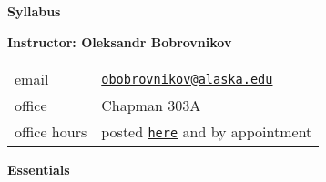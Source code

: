\documentclass[12pt]{article}
\renewcommand{\emph}[1]{\textsf{\textbf{#1}}}
\newcommand{\localhead}[1]{\par\smallskip\textbf{#1}\nobreak\\}%
\def\heading#1{\localhead{\large\emph{#1}}}
\begin{document}
\begin{center}
{\Huge \strut}{\LARGE\sf \textbf{Syllabus}}
\end{center}

\heading{Instructor: \quad Oleksandr Bobrovnikov}

\quad \begin{tabularx}{\textwidth}{lX}
email        & \href{mailto:obobrovnikov@alaska.edu}{\texttt{obobrovnikov@alaska.edu}} \\
office       & Chapman 303A \\
office hours \phantom{jfxdsd} & posted \href{http://blackcurrantpi.github.io/ode}{\tt here} and by appointment
\end{tabularx}

\bigskip

\heading{Essentials}
\end{document}
